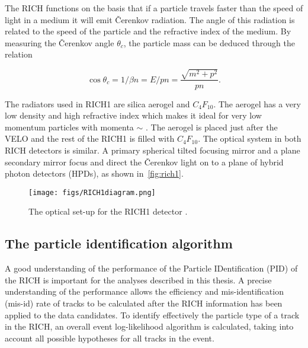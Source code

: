 The RICH functions on the basis that if a particle travels faster than the speed of light in a medium it will emit \v{C}erenkov radiation. The angle of this radiation is related to the speed of the particle and the refractive index of the medium.  By measuring the \v{C}erenkov angle $\theta_{c}$, the particle mass can be deduced through the relation

\begin{equation}
  \cos\theta_{c} = 1/\beta n  = E/pn =  \frac{\sqrt{m^{2} + p^{2}}}{pn}.
\end{equation}

The radiators used in RICH1 are silica aerogel and $C_{4}F_{10}$. The aerogel has a very low density and high refractive index which makes it ideal for very low momentum particles with momenta $\sim$ \gevc. The aerogel is placed just after the VELO and the rest of the RICH1 is filled with $C_{4}F_{10}$. The optical system in both RICH detectors is similar. A primary spherical tilted focusing mirror and a plane secondary mirror focus and direct the \v{C}erenkov light on to a plane of hybrid photon detectors (HPDs), as shown in~\autoref{fig:rich1}.


\begin{figure}[h!]
  \centering
  \texttt{[image: figs/RICH1diagram.png]} 
  \caption{The optical set-up for the RICH1 detector \cite{rich1dia}.
  }
  \label{fig:rich1}
\end{figure}


\subsection{The particle identification algorithm}
A good understanding of the performance of the Particle IDentification (\Gls{PID}) of the RICH is important for the analyses described in this thesis. A precise understanding of the performance  allows the efficiency and mis-identification (mis-id) rate of tracks to be calculated after the RICH information has been applied to the data candidates. To identify effectively the particle type of a track in the RICH, an overall event log-likelihood algorithm is calculated, taking into account all possible hypotheses for all tracks in the event. %

